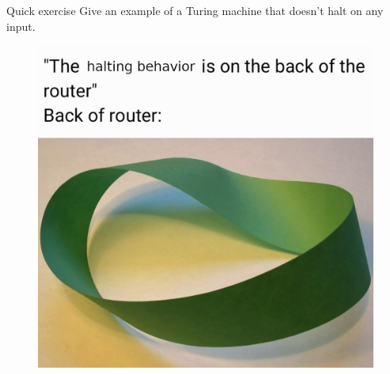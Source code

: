 \documentclass{beamer}
\begin{document}
\begin{frame}{Quick exercise}
Give an example of a Turing machine that doesn't halt on any input.
\begin{figure}[h]
\includegraphics[scale=0.7]{img/halting.jpg}
\end{figure}
\end{frame}
\end{document}
